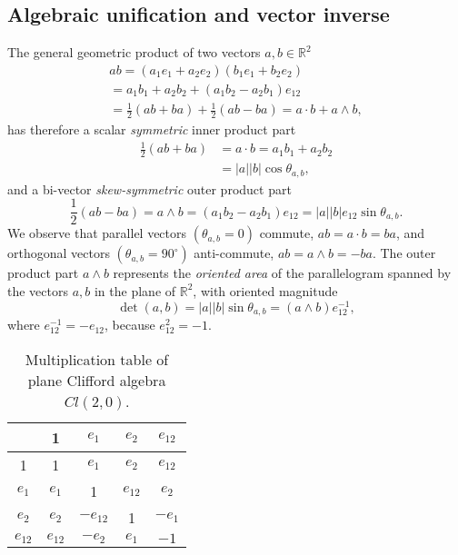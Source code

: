 \documentclass[cameraready]{jcmsi}%
\newcommand{\R}{\mathbb{R}}
\newcommand{\be}{\begin{equation}}
\newcommand{\ee}{\end{equation}}
\begin{document}
\subsection{Algebraic unification and vector inverse}

The general geometric product of two vectors $a,b \in \R^2$ 
\begin{gather}
  ab=(a_1e_1+a_2e_2)(b_1e_1+b_2e_2) \nonumber \\
  = a_1b_1 + a_2b_2 + (a_1b_2 - a_2b_1) e_{12} \\
  = \frac{1}{2}(ab+ba) + \frac{1}{2}(ab-ba)
  = a \cdot b + a\wedge b,
  \nonumber 
\end{gather} 
has therefore a scalar \textit{symmetric} inner product part
\begin{align} 
  \frac{1}{2}(ab+ba) 
  &= a \cdot b  
  =a_1b_1 + a_2b_2 
  \nonumber \\
  &= |a| |b| \cos \theta_{a,b},
\end{align} 
and a bi-vector \textit{skew-symmetric} outer product part
\be 
  \frac{1}{2}(ab-ba)=a\wedge b 
  =(a_1b_2 - a_2b_1) e_{12} = |a| |b| e_{12}\sin \theta_{a,b}. 
\ee
We observe that parallel vectors $(\theta_{a,b}=0)$ commute, $ab = a\cdot b = ba$, and orthogonal vectors $(\theta_{a,b}=90^{\circ})$ anti-commute, $ab = a \wedge b = -ba$. 
The outer product part $a\wedge b$ represents the \textit{oriented area} of the parallelogram spanned by the vectors $a,b$ in the plane of $\R^2$, with oriented magnitude 
\be 
\det(a,b) = |a| |b| \sin \theta_{a,b} = (a\wedge b) e_{12}^{-1},
\ee
where $e_{12}^{-1} = -e_{12}$, because $e_{12}^2=-1$.  

\begin{table}
\caption{Multiplication table of plane Clifford algebra $Cl(2,0)$.}
\label{tb:Cl2mtable}
\begin{center}
\begin{tabular}{c|cccc}
       & 1 & $e_1$ & $e_2$ & $e_{12}$\\
 \hline
 1     & 1 & $e_1$ & $e_2$ & $e_{12}$\\
 $e_1$ & $e_1$ & 1 & $e_{12}$ & $e_{2}$\\
 $e_2$ & $e_2$ & $-e_{12}$ & 1 & $-e_{1}$\\
 $e_{12}$ & $e_{12}$ & $-e_{2}$ & $e_1$ & $-1$ 
\end{tabular}
\end{center}
\end{table}
\end{document}
